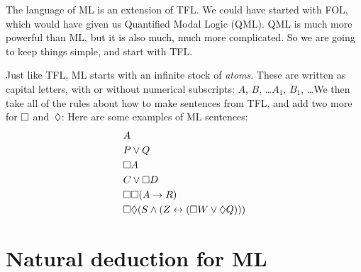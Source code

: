 The language of ML is an extension of TFL. We could have started with FOL, which would have given us Quantified Modal Logic (QML). QML is much more powerful than ML, but it is also much, much more complicated. So we are going to keep things simple, and start with TFL.

Just like TFL, ML starts with an infinite stock of \emph{atoms}. These are written as capital letters, with or without numerical subscripts: $A$, $B$, \dots  $A_1$, $B_1$, \dots  We then take all of the rules about how to make sentences from TFL, and add two more for $\Box$ and~$\Diamond$:
Here are some examples of ML sentences:
\begin{align*}
	& A\\
	& P\vee Q\\
	& \Box A\\
	& C\vee \Box D\\
	& \Box\Box (A\rightarrow R)\\
	& \Box\Diamond (S\wedge (Z\leftrightarrow (\Box W \vee \Diamond Q)))
\end{align*}

\chapter{Natural deduction for ML}
\label{Proof}

